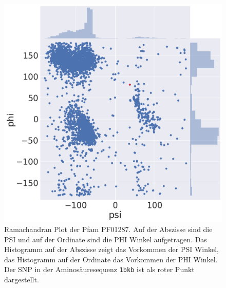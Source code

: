 \begin{figure}
    \centering
    \includegraphics[width=.90\textwidth]{images/ramachandranplot_PF01287.png}
    \caption{Ramachandran Plot der Pfam PF01287. Auf der Abszisse sind die PSI und auf der Ordinate sind die PHI Winkel aufgetragen. Das Histogramm auf der Abszisse zeigt das Vorkommen der PSI Winkel, das Histogramm auf der Ordinate das Vorkommen der PHI Winkel. Der \ac{SNP} in der Aminosäuresequenz \texttt{1bkb} ist als roter Punkt dargestellt.}
    \label{fig:ramachandran_PF01287}
\end{figure}


